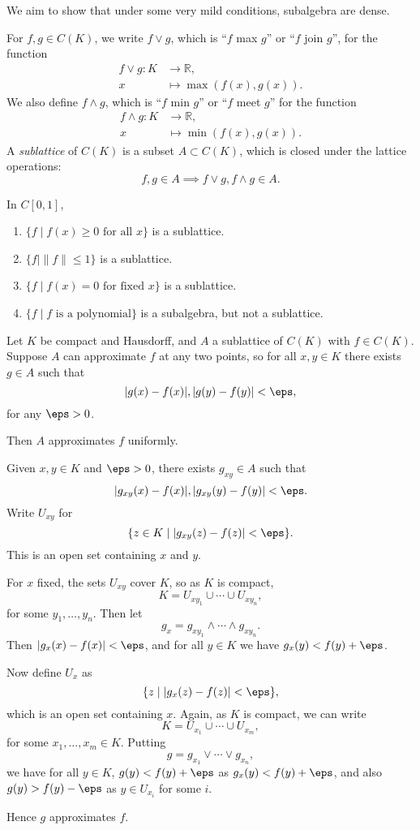 \documentclass[12pt]{article}
\begin{document}
We aim to show that under some very mild conditions, subalgebra are dense.

For $f, g \in C(K)$, we write $f \vee g$, which is ``$f$ max $g$'' or ``$f$ join $g$'', for the function
\begin{align*}
	f \vee g : K &\to \mathbb{R}, \\
x &\mapsto \max(f(x), g(x)).
\end{align*}
We also define $f \wedge g$, which is ``$f$ min $g$'' or ``$f$ meet $g$'' for the function
\begin{align*}
	f \wedge g : K &\to \mathbb{R},\\
	x &\mapsto \min(f(x), g(x)).
\end{align*}
A \emph{sublattice} of $C(K)$ is a subset $A \subset C(K)$, which is closed under the lattice operations:
\[
f, g \in A \implies f \vee g, f \wedge g \in A.
\]
\begin{exbox}
	In $C[0,1]$,
	\begin{enumerate}
		\item $\{f \mid f(x) \geq 0 \text{ for all } x\}$ is a sublattice.
		\item $\{f \mid \|f\| \leq 1\}$ is a sublattice.
		\item $\{f \mid f(x) = 0 \text{ for fixed } x\}$ is a sublattice.
		\item $\{f \mid f \text{ is a polynomial}\}$ is a subalgebra, but not a sublattice.
	\end{enumerate}
\end{exbox}

\begin{lemma}
	Let $K$ be compact and Hausdorff, and $A$ a sublattice of $C(K)$ with $f \in C(K)$. Suppose $A$ can approximate $f$ at any two points, so for all $x, y \in K$ there exists $g \in A$ such that
	\[
	|g(x) - f(x)|, |g(y) - f(y)| < \eps,
	\]
	for any $\eps > 0$.

	Then $A$ approximates $f$ uniformly.
\end{lemma}

\begin{proofbox}
	Given $x, y \in K$ and $\eps > 0$, there exists $g_{xy} \in A$ such that
	\[
	|g_{xy}(x) - f(x)|, |g_{xy}(y) - f(y)| < \eps.
	\]
	Write $U_{xy}$ for
	\[
		\{z \in K \mid |g_{xy}(z) - f(z)| < \eps\}.
	\]
	This is an open set containing $x$ and $y$.

	For $x$ fixed, the sets $U_{xy}$ cover $K$, so as $K$ is compact,
	\[
	K = U_{xy_1} \cup \cdots \cup U_{xy_n},
	\]
	for some $y_1, \ldots, y_n$. Then let
	\[
	g_x = g_{xy_1} \wedge \cdots \wedge g_{xy_n}.
	\]
	Then $|g_x(x) - f(x)| < \eps$, and for all $y \in K$ we have $g_x(y) < f(y) + \eps$.

	Now define $U_x$ as
	\[
		\{z \mid |g_x(z) - f(z)| < \eps\},
	\]
	which is an open set containing $x$. Again, as $K$ is compact, we can write
	\[
	K = U_{x_1} \cup \cdots \cup U_{x_m},
	\]
	for some $x_1, \ldots, x_m \in K$. Putting
	\[
	g = g_{x_1} \vee \cdots \vee g_{x_n},
	\]
	we have for all $y \in K$, $g(y) < f(y) + \eps$ as $g_x(y) < f(y) + \eps$, and also $g(y) > f(y) - \eps$ as $y \in U_{x_i}$ for some $i$.

	Hence $g$ approximates $f$.
\end{proofbox}
\end{document}
